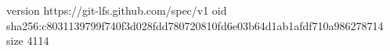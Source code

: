 version https://git-lfs.github.com/spec/v1
oid sha256:c8031139799f740f3d028fdd780720810fd6e03b64d1ab1afdf710a986278714
size 4114
